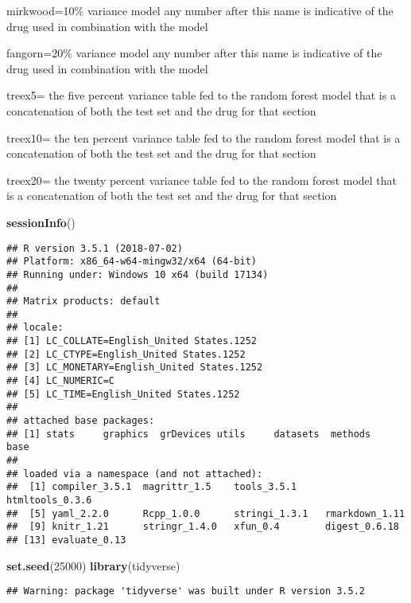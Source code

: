 \documentclass[]{article}
\newenvironment{Shaded}{\begin{snugshade}}{\end{snugshade}}
\newcommand{\KeywordTok}[1]{\textcolor[rgb]{0.13,0.29,0.53}{\textbf{#1}}}
\newcommand{\DecValTok}[1]{\textcolor[rgb]{0.00,0.00,0.81}{#1}}
\newcommand{\NormalTok}[1]{#1}
\begin{document}
mirkwood=10\% variance model any number after this name is indicative of
the drug used in combination with the model

fangorn=20\% variance model any number after this name is indicative of
the drug used in combination with the model

treex5= the five percent variance table fed to the random forest model
that is a concatenation of both the test set and the drug for that
section

treex10= the ten percent variance table fed to the random forest model
that is a concatenation of both the test set and the drug for that
section

treex20= the twenty percent variance table fed to the random forest
model that is a concatenation of both the test set and the drug for that
section

\begin{Shaded}
\begin{Highlighting}[]
\KeywordTok{sessionInfo}\NormalTok{()}
\end{Highlighting}
\end{Shaded}

\begin{verbatim}
## R version 3.5.1 (2018-07-02)
## Platform: x86_64-w64-mingw32/x64 (64-bit)
## Running under: Windows 10 x64 (build 17134)
## 
## Matrix products: default
## 
## locale:
## [1] LC_COLLATE=English_United States.1252 
## [2] LC_CTYPE=English_United States.1252   
## [3] LC_MONETARY=English_United States.1252
## [4] LC_NUMERIC=C                          
## [5] LC_TIME=English_United States.1252    
## 
## attached base packages:
## [1] stats     graphics  grDevices utils     datasets  methods   base     
## 
## loaded via a namespace (and not attached):
##  [1] compiler_3.5.1  magrittr_1.5    tools_3.5.1     htmltools_0.3.6
##  [5] yaml_2.2.0      Rcpp_1.0.0      stringi_1.3.1   rmarkdown_1.11 
##  [9] knitr_1.21      stringr_1.4.0   xfun_0.4        digest_0.6.18  
## [13] evaluate_0.13
\end{verbatim}

\begin{Shaded}
\begin{Highlighting}[]
\KeywordTok{set.seed}\NormalTok{(}\DecValTok{25000}\NormalTok{)}
\KeywordTok{library}\NormalTok{(tidyverse)}
\end{Highlighting}
\end{Shaded}

\begin{verbatim}
## Warning: package 'tidyverse' was built under R version 3.5.2
\end{verbatim}
\end{document}
